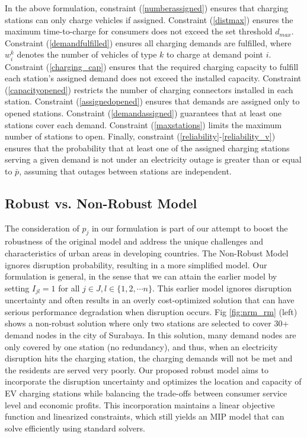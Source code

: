 \documentclass[preprint]{oscmjournal}
\theoremstyle{remark}
\begin{document}
 In the above formulation, constraint (\ref{numberassigned}) ensures that charging stations can only charge vehicles if assigned. Constraint (\ref{distmax}) ensures the maximum time-to-charge for consumers does not exceed the set threshold $d_{max}$. Constraint (\ref{demandfulfilled}) ensures all charging demands are fulfilled, where $w_i^k$ denotes the number of vehicles of type $k$ to charge at demand point $i$. Constraint (\ref{charging_cap}) ensures that the required charging capacity to fulfill each station's assigned demand does not exceed the installed capacity. Constraint (\ref{capacityopened}) restricts the number of charging connectors installed in each station. Constraint (\ref{assignedopened}) ensures that demands are assigned only to opened stations. Constraint (\ref{demandassigned}) guarantees that at least one stations cover each demand. Constraint (\ref{maxstations}) limits the maximum number of stations to open.
 Finally, constraint (\ref{reliability}-\ref{reliability_v}) ensures that the probability that at least one of the assigned charging stations serving a given demand is not under an electricity outage is greater than or equal to $\bar{p}$, assuming that outages between stations are independent. 


\subsection{Robust vs. Non-Robust Model}

The consideration of $p_j$ in our formulation is part of our attempt to boost the robustness of the original model and address the unique challenges and characteristics of urban areas in developing countries. The Non-Robust Model ignores disruption probability, resulting in a more simplified model. Our formulation is general, in the sense that we can attain the earlier model by setting $I_{jl} = 1$ for all $j \in J, l \in \{1, 2, \cdots n\}$. This earlier model ignores disruption uncertainty and often results in an overly cost-optimized solution that can have serious performance degradation when disruption occurs. Fig \ref{fig:nrm_rm} (left) shows a non-robust solution where only two stations are selected to cover 30+ demand nodes in the city of Surabaya. In this solution, many demand nodes are only covered by one station (no redundancy), and thus, when an electricity disruption hits the charging station, the charging demands will not be met and the residents are served very poorly. Our proposed robust model aims to incorporate the disruption uncertainty and optimizes the location and capacity of EV charging stations while balancing the trade-offs between consumer service level and economic profits. This incorporation maintains a linear objective function and linearized constraints, which still yields an MIP model that can solve efficiently using standard solvers. 
\end{document}
